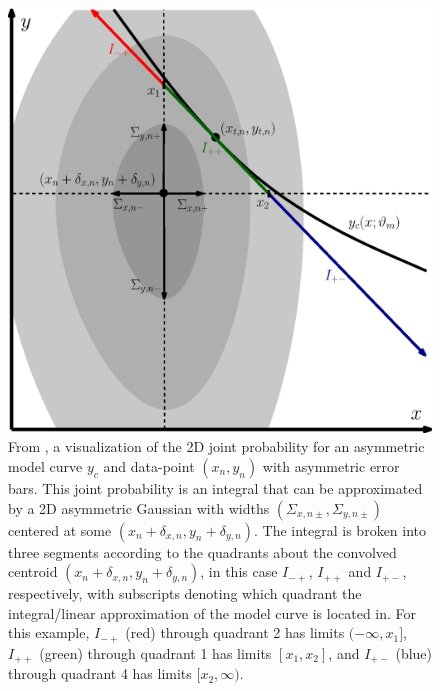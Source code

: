 \begin{figure}
    \centering
    \includegraphics[width=0.8\linewidth]{figures/dia_asymint.eps}
    \caption{From \textcite{trotter}, a visualization of the 2D joint probability for an asymmetric model curve $y_c$ and data-point $(x_n,y_n)$ with asymmetric error bars. This joint probability is an integral that can be approximated by a 2D asymmetric Gaussian with widths $(\Sigma_{x,n\pm}, \Sigma_{y,n\pm})$ centered at some $(x_n+\delta_{x,n}, y_n+\delta_{y,n})$. The integral is broken into three segments according to the quadrants about the convolved centroid $(x_n+\delta_{x,n}, y_n+\delta_{y,n})$, in this case $I_{-+}$, $I_{++}$ and $I_{+-}$, respectively, with subscripts denoting which quadrant the integral/linear approximation of the model curve is located in. For this example, $I_{-+}$ (red) through quadrant 2 has limits $(-\infty,x_1]$, $I_{++}$ (green) through quadrant 1 has limits $[x_1,x_2]$, and $I_{+-}$ (blue) through quadrant 4 has limits $[x_2,\infty)$.}
    \label{fig:asymm}
\end{figure}

